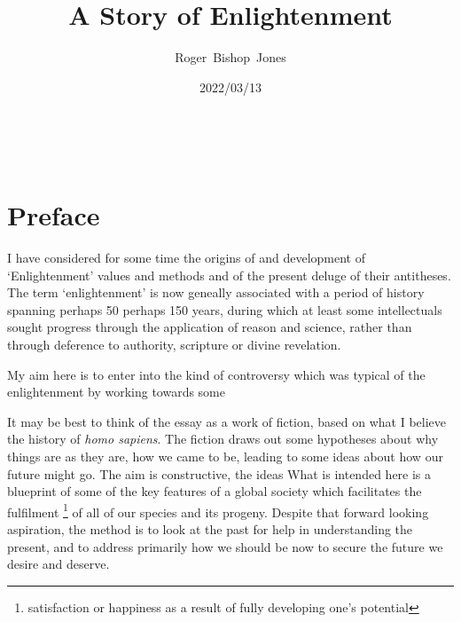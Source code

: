 \documentclass[10pt,titlepage]{article}
\title{\LARGE\bf A Story of Enlightenment}
\author{Roger~Bishop~Jones}
\date{\small 2022/03/13}
\newcommand{\ignore}[1]{}
\begin{document}
                               
\begin{titlepage}
\maketitle





\end{titlepage}

\ \

\ignore{
\begin{centering}
{}
\end{centering}
}%

\setcounter{tocdepth}{2}
{\parskip-0pt\tableofcontents}


\pagebreak

\section*{Preface}

I have considered for some time the origins of and development of `Enlightenment' values and methods and of the present deluge of their antitheses.
The term `enlightenment' is now geneally associated with a period of history spanning perhaps 50 perhaps 150 years, during which at least some intellectuals sought progress through the application of reason and science, rather than through deference to authority, scripture or divine revelation.

My aim here is to enter into the kind of controversy which was typical of the enlightenment by working towards some 



It may be best to think of the essay as a work of fiction, based on what I believe the history of \emph{homo sapiens}.
The fiction draws out some hypotheses about why things are as they are, how we came to be, leading to some ideas about how our future might go.
The aim is constructive, the ideas
What is intended here is a blueprint of some of the key features of a global society which facilitates the fulfilment%
\footnote{satisfaction or happiness as a result of fully developing one's potential}
of all of our species and its progeny.
Despite that forward looking aspiration, the method is to look at the past for help in understanding the present, and to address primarily how we should be now to secure the future we desire and deserve.
\end{document}
